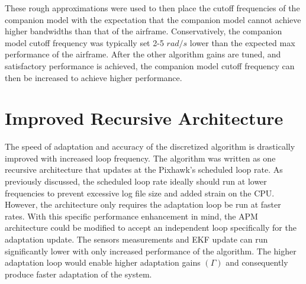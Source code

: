 These rough approximations were used to then place the cutoff frequencies of the companion model with the expectation that the companion model cannot achieve higher bandwidths than that of the airframe.  Conservatively, the companion model cutoff frequency was typically set 2-5 $rad/s$ lower than the expected max performance of the airframe.  After the other algorithm gains are tuned, and satisfactory performance is achieved, the companion model cutoff frequency can then be increased to achieve higher performance.

\section{Improved Recursive Architecture}

The speed of adaptation and accuracy of the discretized \Lone algorithm is drastically improved with increased loop frequency.  The algorithm was written as one recursive architecture that updates at the Pixhawk's scheduled loop rate.  As previously discussed, the scheduled loop rate ideally should run at lower frequencies to prevent excessive log file size and added strain on the CPU.  However, the \Lone architecture only requires the adaptation loop be run at faster rates.  With this specific performance enhancement in mind, the \ac{APM} architecture could be modified to accept an independent loop specifically for the \Lone adaptation update.  The sensors measurements and \ac{EKF} update can run significantly lower with only increased performance of the algorithm.  The higher adaptation loop would enable higher adaptation gains $(\Gamma)$ and consequently produce faster adaptation of the system.



